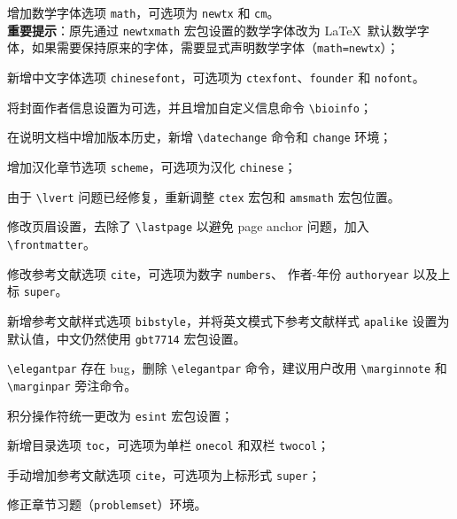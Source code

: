 \documentclass[lang=cn,newtx,10pt,scheme=chinese]{elegantbook}
\begin{document}
\begin{change}
  \item 增加数学字体选项 \lstinline{math}，可选项为 \lstinline{newtx} 和 \lstinline{cm}。\\
  \textbf{重要提示}：原先通过 \lstinline{newtxmath} 宏包设置的数学字体改为 \LaTeX\ 默认数学字体，如果需要保持原来的字体，需要显式声明数学字体（\lstinline{math=newtx}）；
  \item 新增中文字体选项 \lstinline{chinesefont}，可选项为 \lstinline{ctexfont}、\lstinline{founder} 和 \lstinline{nofont}。
  \item 将封面作者信息设置为可选，并且增加自定义信息命令 \lstinline{\bioinfo}；
  \item 在说明文档中增加版本历史，新增 \lstinline{\datechange} 命令和 \lstinline{change} 环境；
  \item 增加汉化章节选项 \lstinline{scheme}，可选项为汉化 \lstinline{chinese}；
  \item 由于 \lstinline{\lvert} 问题已经修复，重新调整 \lstinline{ctex} 宏包和 \lstinline{amsmath} 宏包位置。
  \item 修改页眉设置，去除了 \lstinline{\lastpage} 以避免 page anchor 问题，加入 \lstinline{\frontmatter}。
  \item 修改参考文献选项 \lstinline{cite}，可选项为数字 \lstinline{numbers}、 作者-年份 \lstinline{authoryear} 以及上标 \lstinline{super}。
  \item 新增参考文献样式选项 \lstinline{bibstyle}，并将英文模式下参考文献样式 \lstinline{apalike} 设置为默认值，中文仍然使用 \lstinline{gbt7714} 宏包设置。
\end{change}


\begin{change}
  \item \lstinline{\elegantpar} 存在 bug，删除 \lstinline{\elegantpar} 命令，建议用户改用 \lstinline{\marginnote} 和 \lstinline{\marginpar} 旁注命令。
  \item 积分操作符统一更改为 \lstinline{esint} 宏包设置；
  \item 新增目录选项 \lstinline{toc}，可选项为单栏 \lstinline{onecol} 和双栏 \lstinline{twocol}；
  \item 手动增加参考文献选项 \lstinline{cite}，可选项为上标形式 \lstinline{super}；
  \item 修正章节习题（\lstinline{problemset}）环境。
\end{change}

\end{document}
